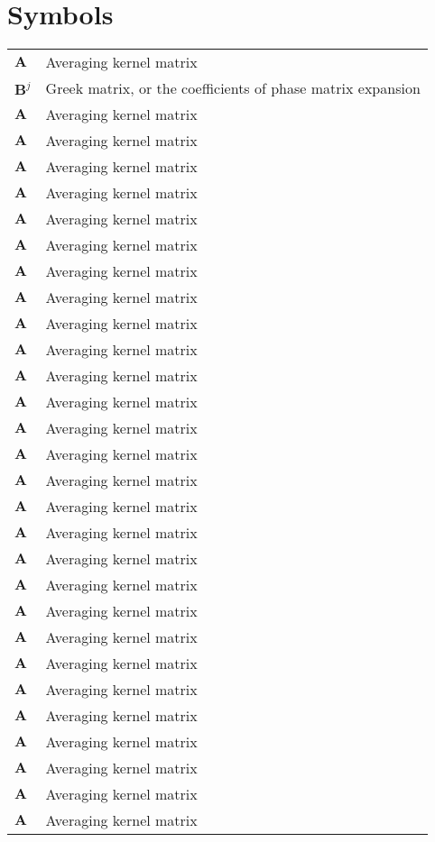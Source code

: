 \chapter{Symbols}

\begin{center}
\begin{small}
\begin{longtable}{R{5em} p{30em} }
  $\mathbf{A}$     & Averaging kernel matrix \\
  $\mathbf{B}^j$   & Greek matrix, or the coefficients of phase matrix
expansion \\
  $\mathbf{A}$     & Averaging kernel matrix \\
  $\mathbf{A}$     & Averaging kernel matrix \\
  $\mathbf{A}$     & Averaging kernel matrix \\
  $\mathbf{A}$     & Averaging kernel matrix \\
  $\mathbf{A}$     & Averaging kernel matrix \\
  $\mathbf{A}$     & Averaging kernel matrix \\
  $\mathbf{A}$     & Averaging kernel matrix \\
  $\mathbf{A}$     & Averaging kernel matrix \\
  $\mathbf{A}$     & Averaging kernel matrix \\
  $\mathbf{A}$     & Averaging kernel matrix \\
  $\mathbf{A}$     & Averaging kernel matrix \\
  $\mathbf{A}$     & Averaging kernel matrix \\
  $\mathbf{A}$     & Averaging kernel matrix \\
  $\mathbf{A}$     & Averaging kernel matrix \\
  $\mathbf{A}$     & Averaging kernel matrix \\
  $\mathbf{A}$     & Averaging kernel matrix \\
  $\mathbf{A}$     & Averaging kernel matrix \\
  $\mathbf{A}$     & Averaging kernel matrix \\
  $\mathbf{A}$     & Averaging kernel matrix \\
  $\mathbf{A}$     & Averaging kernel matrix \\
  $\mathbf{A}$     & Averaging kernel matrix \\
  $\mathbf{A}$     & Averaging kernel matrix \\
  $\mathbf{A}$     & Averaging kernel matrix \\
  $\mathbf{A}$     & Averaging kernel matrix \\
  $\mathbf{A}$     & Averaging kernel matrix \\
  $\mathbf{A}$     & Averaging kernel matrix \\
  $\mathbf{A}$     & Averaging kernel matrix \\
  $\mathbf{A}$     & Averaging kernel matrix \\
\end{longtable}
\end{small}
\end{center}
